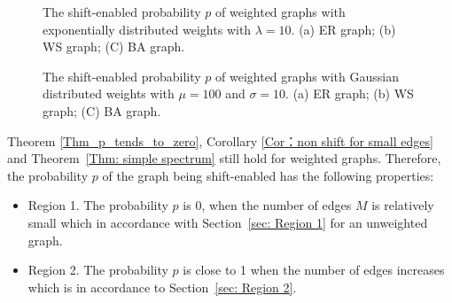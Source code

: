 \documentclass[journal]{IEEEtran}
\begin{document}
 


\begin{figure}[htb]
	\centering
	\caption{The shift-enabled probability $p$ of weighted graphs with exponentially distributed weights with $\lambda=10$. (a){ ER graph; (b) WS graph;} (C) BA graph.}
	\label{fig:graph compare with with exponentially distributed weights}
\end{figure}


\begin{figure}[htb]
	\centering
	\caption{The shift-enabled probability $p$ of weighted graphs with Gaussian distributed weights with $\mu=100$ and $\sigma=10$. {(a) ER graph; (b) WS graph;} (C) BA graph.}
	\label{fig:graph compare with Gaussian distributed weights}
\end{figure}

\begin{Thm}{\label{Thm:general law_weighted_graph}}
Theorem \ref{Thm_p_tends_to_zero}, Corollary \ref{Cor：non shift for small edges} and Theorem~\ref{Thm: simple spectrum} still hold for weighted graphs. Therefore, the probability $p$ of the graph being shift-enabled has the following properties:
\begin{itemize}
	\item {Region 1.} The probability $p$ is $0$, when the number of edges $M$ is relatively small which in accordance with Section~\ref{sec: Region 1} for an unweighted graph.
	\item {Region 2.}
	The probability $p$ is close to 1 when the number of edges increases which is in accordance to Section~\ref{sec: Region 2}.
	\end{itemize}
\end{Thm}
\end{document}
